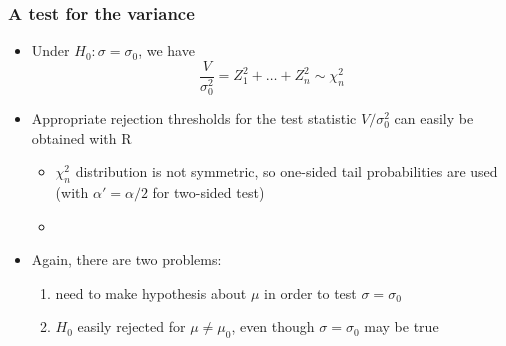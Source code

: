 \documentclass[t]{beamer} %
\begin{document}
\begin{frame}
  \frametitle{A test for the variance}

  \begin{itemize}
  \item Under $H_0: \sigma = \sigma_0$, we have
    \[
    \frac{V}{\sigma_0^2} = Z_1^2 + \dots + Z_n^2 \sim \chi^2_n
    \]
  \item Appropriate rejection thresholds for the test statistic $V / \sigma_0^2$ can easily be obtained with R
    \begin{itemize}
    \item $\chi^2_n$ distribution is not symmetric, so one-sided tail
      probabilities are used (with $\alpha' = \alpha/2$ for two-sided test)
    \item[]
    \end{itemize}
    \pause
  \item Again, there are two problems:
    \begin{enumerate}
    \item need to make hypothesis about $\mu$ in order to test $\sigma = \sigma_0$
    \item $H_0$ easily rejected for $\mu \neq \mu_0$, even though
      $\sigma=\sigma_0$ may be true
    \end{enumerate}
  \end{itemize}
\end{frame}
\end{document}
